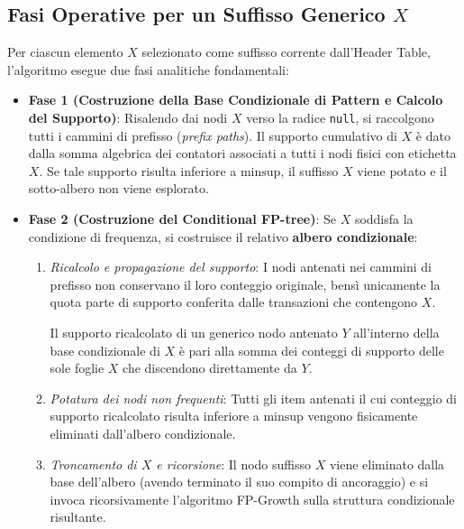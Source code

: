 \FloatBarrier
\subsection{Fasi Operative per un Suffisso Generico $X$}
Per ciascun elemento $X$ selezionato come suffisso corrente dall'Header Table, l'algoritmo esegue due fasi analitiche fondamentali:
\begin{itemize}
    \item \textbf{Fase 1 (Costruzione della Base Condizionale di Pattern e Calcolo del Supporto)}: Risalendo dai nodi $X$ verso la radice \texttt{null}, si raccolgono tutti i cammini di prefisso (\textit{prefix paths}). Il supporto cumulativo di $X$ è dato dalla somma algebrica dei contatori associati a tutti i nodi fisici con etichetta $X$. Se tale supporto risulta inferiore a $\text{minsup}$, il suffisso $X$ viene potato e il sotto-albero non viene esplorato.
    \item \textbf{Fase 2 (Costruzione del Conditional FP-tree)}: Se $X$ soddisfa la condizione di frequenza, si costruisce il relativo \textbf{albero condizionale}:
    \begin{enumerate}[label=\alph*.]
        \item \textit{Ricalcolo e propagazione del supporto}: I nodi antenati nei cammini di prefisso non conservano il loro conteggio originale, bensì unicamente la quota parte di supporto conferita dalle transazioni che contengono $X$.
        \begin{property}
        Il supporto ricalcolato di un generico nodo antenato $Y$ all'interno della base condizionale di $X$ è pari alla somma dei conteggi di supporto delle sole foglie $X$ che discendono direttamente da $Y$.
        \end{property}
        \item \textit{Potatura dei nodi non frequenti}: Tutti gli item antenati il cui conteggio di supporto ricalcolato risulta inferiore a $\text{minsup}$ vengono fisicamente eliminati dall'albero condizionale.
        \item \textit{Troncamento di $X$ e ricorsione}: Il nodo suffisso $X$ viene eliminato dalla base dell'albero (avendo terminato il suo compito di ancoraggio) e si invoca ricorsivamente l'algoritmo FP-Growth sulla struttura condizionale risultante.
    \end{enumerate}
\end{itemize}

\FloatBarrier
